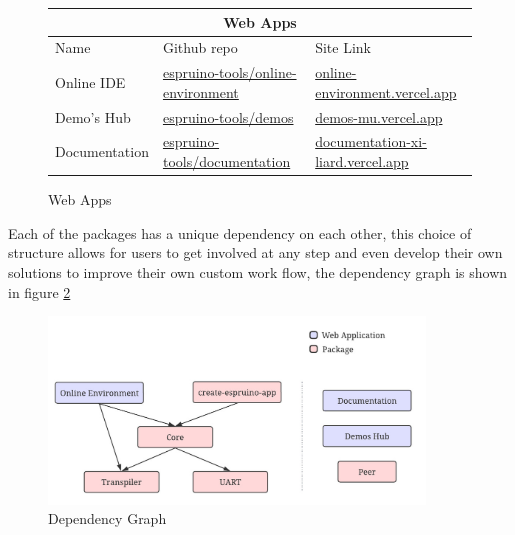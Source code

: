 \documentclass{l4proj}
\begin{document}
\begin{figure}[!ht]
\begin{center}
\begin{tabular}{|p{2.5cm}|p{5.5cm}|p{5.5cm}|}
\hline
\multicolumn{3}{|c|}{Web Apps} \\
 \hline
 Name & Github repo & Site Link\\
 \hline
Online IDE & \href{https://github.com/espruino-tools/online-environment}{espruino-tools/online-environment} & \href{https://online-environment.vercel.app/}{online-environment.vercel.app} \\
Demo's Hub & \href{https://github.com/espruino-tools/demos}{espruino-tools/demos}  & \href{https://demos-mu.vercel.app/}{demos-mu.vercel.app} \\
Documentation & \href{https://github.com/espruino-tools/documentation}{espruino-tools/documentation} & \href{https://documentation-xi-liard.vercel.app/}{documentation-xi-liard.vercel.app} \\
 \hline
\end{tabular}
\end{center}
\caption{Web Apps}
\label{fig:webapps}
\end{figure}

Each of the packages has a unique dependency on each other, this choice of structure allows for users to get involved at any step and even develop their own solutions to improve their own custom work flow, the dependency graph is shown in figure \ref{fig:package_dep_graph}


\begin{figure}[!ht]
    \centering
    \includegraphics[width=10cm]{dissertation/images/Package_dependency_graph.jpeg}
    \caption{Dependency Graph}
    \label{fig:package_dep_graph}
\end{figure}
\end{document}
